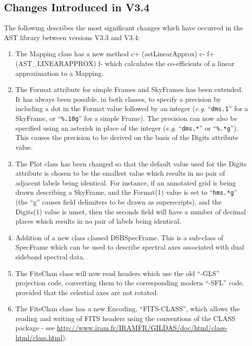\documentclass[twoside,11pt]{starlink}
\begin{document}
\subsection{Changes Introduced in V3.4}

The following describes the most significant changes which have
occurred in the AST library between versions V3.3 and V3.4:

\begin{enumerate}

\item The Mapping class has a new method
c+
(astLinearApprox)
c-
f+
(AST\_LINEARAPPROX)
f-
which calculates the co-efficients of a linear approximation to a Mapping.

\item The Format attribute for simple Frames and SkyFrames has been extended.
It has always been possible, in both classes, to specify a precision by
including a dot in the Format value followed by an integer (\emph{e.g.}
``\verb+dms.1+'' for a SkyFrame, or ``\verb+%.10g+'' for a simple Frame).
The precision can now also be specified using an asterisk in place of the
integer (\emph{e.g.} ``\verb+dms.*+'' or ``\verb+%.*g+''). This causes the
precision to be derived on the basis of the Digits attribute value.

\item The Plot class has been changed so that the default value used for the
Digits attribute is chosen to be the smallest value which results in no
pair of adjacent labels being identical. For instance, if an annotated
grid is being drawn describing a SkyFrame, and the Format(1) value is set
to ``\verb+hms.*g+'' (the ``g'' causes field delimiters to be drawn as
superscripts), and the Digits(1) value is unset, then the seconds field
will have a number of decimal places which results in no pair of labels
being identical.

\item Addition of a new class classed DSBSpecFrame. This is a
sub-class of SpecFrame which can be used to describe spectral axes
associated with dual sideband spectral data.

\item The FitsChan class will now read headers which use the old ``-GLS''
projection code, converting them to the corresponding modern ``-SFL'' code,
provided that the celestial axes are not rotated.

\item The FitsChan class has a new Encoding, ``FITS-CLASS'', which allows
the reading and writing of FITS headers using the conventions of the CLASS
package - see
\url{http://www.iram.fr/IRAMFR/GILDAS/doc/html/class-html/class.html}).

\end{enumerate}
\end{document}

